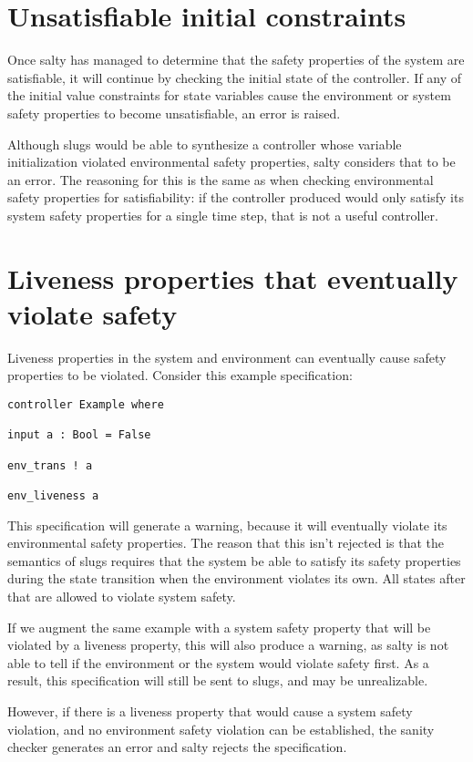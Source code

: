 \section{Unsatisfiable initial constraints}

Once salty has managed to determine that the safety properties of the system are satisfiable, it will continue by checking the initial state of the controller. If any of the initial value constraints for state variables cause the environment or system safety properties to become unsatisfiable, an error is raised.

Although slugs would be able to synthesize a controller whose variable initialization violated environmental safety properties, salty considers that to be an error. The reasoning for this is the same as when checking environmental safety properties for satisfiability: if the controller produced would only satisfy its system safety properties for a single time step, that is not a useful controller.

\section{Liveness properties that eventually violate safety}

Liveness properties in the system and environment can eventually cause safety properties to be violated. Consider this example specification:
\begin{lstlisting}
controller Example where

input a : Bool = False

env_trans ! a

env_liveness a
\end{lstlisting}
This specification will generate a warning, because it will eventually violate its environmental safety properties. The reason that this isn't rejected is that the semantics of slugs requires that the system be able to satisfy its safety properties during the state transition when the environment violates its own. All states after that are allowed to violate system safety.

If we augment the same example with a system safety property that will be violated by a liveness property, this will also produce a warning, as salty is not able to tell if the environment or the system would violate safety first. As a result, this specification will still be sent to slugs, and may be unrealizable.

However, if there is a liveness property that would cause a system safety violation, and no environment safety violation can be established, the sanity checker generates an error and salty rejects the specification.
